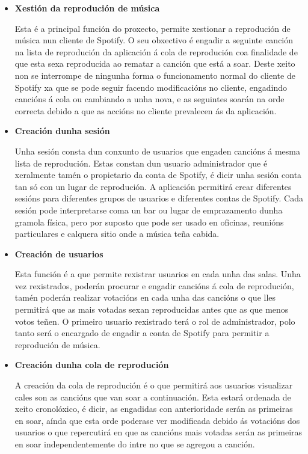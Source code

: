 \begin{itemize}
	\item \textbf{Xestión da reprodución de música}

		Esta é a principal función do proxecto, permite xestionar a reprodución de música nun cliente de Spotify. O seu obxectivo é engadir a seguinte canción na lista de reprodución da aplicación á cola de reprodución coa finalidade de que esta sexa reproducida ao rematar a canción que está a soar. Deste xeito non se interrompe de ningunha forma o funcionamento normal do cliente de Spotify xa que se pode seguir facendo modificacións no cliente, engadindo cancións á cola ou cambiando a unha nova, e as seguintes soarán na orde correcta debido a que as accións no cliente prevalecen ás da aplicación.
		
	\item \textbf{Creación dunha sesión}

		Unha sesión consta dun conxunto de usuarios que engaden cancións á mesma lista de reprodución. Estas constan dun usuario administrador que é xeralmente tamén o propietario da conta de Spotify, é dicir unha sesión conta tan só con un lugar de reprodución. A aplicación permitirá crear diferentes sesións para diferentes grupos de usuarios e diferentes contas de Spotify. Cada sesión pode interpretarse coma un bar ou lugar de emprazamento dunha gramola física, pero por suposto que pode ser usado en oficinas, reunións particulares e calquera sitio onde a música teña cabida.

	\item \textbf{Creación de usuarios}

		Esta función é a que permite rexistrar usuarios en cada unha das salas. Unha vez rexistrados, poderán procurar e engadir cancións á cola de reprodución, tamén poderán realizar votacións en cada unha das cancións o que lles permitirá que as mais votadas sexan reproducidas antes que as que menos votos teñen. O primeiro usuario rexistrado terá o rol de administrador, polo tanto será o encargado de engadir a conta de Spotify para permitir a reprodución de música.

	\item \textbf{Creación dunha cola de reprodución}

		A creación da cola de reprodución é o que permitirá aos usuarios visualizar cales son as cancións que van soar a continuación. Esta estará ordenada de xeito cronolóxico, é dicir, as engadidas con anterioridade serán as primeiras en soar, aínda que esta orde poderase ver modificada debido ás votacións dos usuarios o que repercutirá en que as cancións mais votadas serán as primeiras en soar independentemente do intre no que se agregou a canción.


\end{itemize}

